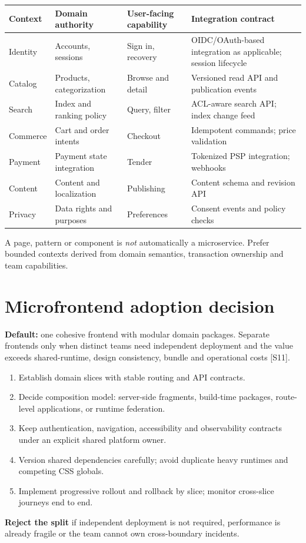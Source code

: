 \documentclass[11pt]{article}
\begin{document}
\begin{tabularx}{\linewidth}{@{}>{\raggedright\arraybackslash}p{30mm}>{\raggedright\arraybackslash}p{32mm}>{\raggedright\arraybackslash}X>{\raggedright\arraybackslash}X@{}}\toprule
Context & Domain authority & User-facing capability & Integration contract\\\midrule
Identity & Accounts, sessions & Sign in, recovery & OIDC/OAuth-based integration as applicable; session lifecycle\\
Catalog & Products, categorization & Browse and detail & Versioned read API and publication events\\
Search & Index and ranking policy & Query, filter & ACL-aware search API; index change feed\\
Commerce & Cart and order intents & Checkout & Idempotent commands; price validation\\
Payment & Payment state integration & Tender & Tokenized PSP integration; webhooks\\
Content & Content and localization & Publishing & Content schema and revision API\\
Privacy & Data rights and purposes & Preferences & Consent events and policy checks\\
\bottomrule\end{tabularx}
\begin{decisionbox}A page, pattern or component is \emph{not} automatically a microservice. Prefer bounded contexts derived from domain semantics, transaction ownership and team capabilities.\end{decisionbox}

\section{Microfrontend adoption decision}

\textbf{Default:} one cohesive frontend with modular domain packages. Separate frontends only when distinct teams need independent deployment and the value exceeds shared-runtime, design consistency, bundle and operational costs [S11].
\begin{enumerate}
\item Establish domain slices with stable routing and API contracts.
\item Decide composition model: server-side fragments, build-time packages, route-level applications, or runtime federation.
\item Keep authentication, navigation, accessibility and observability contracts under an explicit shared platform owner.
\item Version shared dependencies carefully; avoid duplicate heavy runtimes and competing CSS globals.
\item Implement progressive rollout and rollback by slice; monitor cross-slice journeys end to end.
\end{enumerate}
\textbf{Reject the split} if independent deployment is not required, performance is already fragile or the team cannot own cross-boundary incidents.
\end{document}
